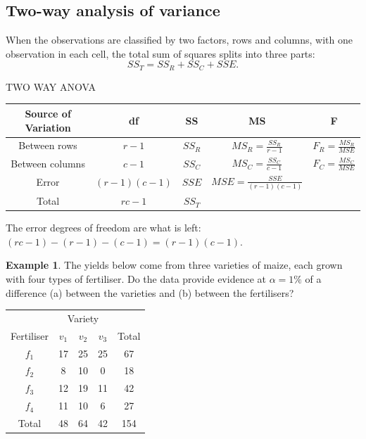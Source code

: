 \documentclass[11pt,a4paper]{article}
\theoremstyle{definition}
\newtheorem{example}[thm]{Example}
\begin{document}
\subsection{Two-way analysis of variance}

When the observations are classified by two factors, rows and columns, with one
observation in each cell, the total sum of squares splits into three parts:
\[SS_T = SS_R + SS_C + SSE .\]

\begin{table}[H]
\centering
TWO WAY ANOVA\\
\begin{tabular}{|c|c|c|c|c|}
\hline
Source of Variation & df & SS & MS & F\\
\hline
Between rows & $r-1$ & $SS_R$ & $MS_R=\frac{SS_R}{r-1}$ & $F_R=\frac{MS_R}{MSE}$\\
Between columns & $c-1$ & $SS_C$ & $MS_C=\frac{SS_C}{c-1}$ & $F_C=\frac{MS_C}{MSE}$\\
Error & $(r-1)(c-1)$ & $SSE$ & $MSE=\frac{SSE}{(r-1)(c-1)}$ &\\
\hline
Total & $rc-1$ & $SS_T$ &&\\
\hline
\end{tabular}
\end{table}
The error degrees of freedom are what is left: $(rc-1)-(r-1)-(c-1) = (r-1)(c-1)$.

\begin{example}
The yields below come from three varieties of maize, each grown with four types of
fertiliser. Do the data provide evidence at $\alpha = 1\%$ of a difference (a) between the
varieties and (b) between the fertilisers?
\begin{table}[H]
\centering
\begin{tabular}{c|ccc|c}
& \multicolumn{3}{c|}{Variety} &\\
Fertiliser & $v_1$ & $v_2$ & $v_3$ & Total\\
\hline
$f_1$ & 17 & 25 & 25 & 67\\
$f_2$ & 8 & 10 & 0 & 18\\
$f_3$ & 12 & 19 & 11 & 42\\
$f_4$ & 11 & 10 & 6 & 27\\
\hline
Total & 48 & 64 & 42 & 154\\
\end{tabular}
\end{table}
\end{example}
\end{document}
